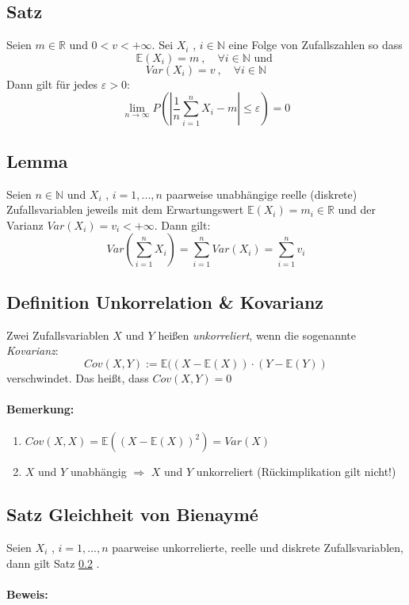 \documentclass[12pt,a4paper]{article}
\begin{document}
	\subsection{Satz}
	Seien $m\in\mathbb{R}$ und $0<v<+\infty$. Sei $X_i$ , $i\in\mathbb{N}$ eine Folge von Zufallszahlen so dass
	$$\mathbb{E}(X_i)=m\: ,\quad \forall i\in\mathbb{N} \text{ und }$$
	$$Var(X_i)=v\: , \quad \forall i \in\mathbb{N}$$
	Dann gilt für jedes $\varepsilon>0$:
	$$\lim_{n\rightarrow\infty} P\left(\left|\frac{1}{n}\sum_{i=1}^n X_i - m\right|\leq\varepsilon\right)=0$$
	
	\subsection{Lemma}
	\label{lemma9.5}
	Seien $n\in\mathbb{N}$ und $X_i$ , $i=1,...,n$ paarweise unabhängige reelle (diskrete) Zufallsvariablen jeweils mit dem Erwartungswert $\mathbb{E}(X_i)=m_i\in\mathbb{R}$ und der Varianz $Var(X_i)=v_i<+\infty$. Dann gilt:
	$$Var\left(\sum_{i=1}^n X_i\right) = \sum_{i=1}^n Var(X_i) = \sum_{i=1}^n v_i$$
	
	\subsection{Definition Unkorrelation \& Kovarianz}
	Zwei Zufallsvariablen $X$ und $Y$ heißen \textit{unkorreliert}, wenn die sogenannte  \textit{Kovarianz}:
	$$Cov(X,Y):=\mathbb{E}((X-\mathbb{E}(X))\cdot (Y-\mathbb{E}(Y))$$
	verschwindet. Das heißt, dass $Cov(X,Y)=0$
	\paragraph{Bemerkung:}
	\begin{enumerate}
		\item $Cov(X,X)=\mathbb{E}((X-\mathbb{E}(X))^2) = Var(X)$
		\item $X$ und $Y$ unabhängig $\Rightarrow$ $X$ und $Y$ unkorreliert (Rückimplikation gilt nicht!)
	\end{enumerate}
	
	\subsection{Satz Gleichheit von Bienaymé}
	Seien $X_i$ , $i=1,...,n$ paarweise unkorrelierte, reelle und diskrete Zufallsvariablen, dann gilt Satz \ref{lemma9.5} .
	\paragraph{Beweis:}
	
\end{document}
